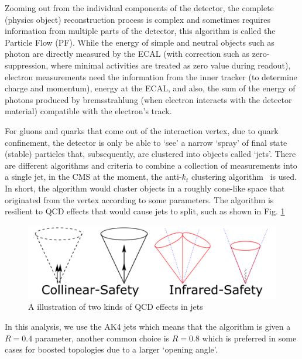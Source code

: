 Zooming out from the individual components of the detector, the complete (physics object) reconstruction
process is complex and sometimes requires information from multiple parts of the detector, this
algorithm is called the Particle Flow (PF)\cite{particle_flow}. While the energy of simple and neutral 
objects such as photon are directly measured by the ECAL (with correction such as zero-suppression, where minimal
activities are treated as zero value during readout), electron measurements
need the information from the inner tracker (to determine charge and momentum), energy at the ECAL, and
also, the sum of the energy of photons produced by bremsstrahlung (when electron interacts with the 
detector material) compatible with the electron's track.

For gluons and quarks that come out of the interaction vertex, due to quark confinement, the detector 
is only be able to `see' a narrow `spray' of final state (stable) particles that, subsequently, 
are clustered into objects called `jets'.
There are different algorithms and criteria to combine a collection of measurements into a single jet,
in the CMS at the moment, the anti-$k_t$ clustering algorithm~\cite{anti_k,fastjet} is used. In short, the algorithm would cluster objects
in a roughly cone-like space that originated from the vertex according to some parameters.
The algorithm is resilient to QCD effects that would cause jets to split, such as shown in Fig.
\ref{fig:jet_split}

\begin{figure}[htb]
\begin{center}
\includegraphics[width=.85\linewidth]{fig/jet_split.png}
\end{center}
\caption{A illustration of two kinds of QCD effects in jets\protect\footnotemark}
\label{fig:jet_split}
\end{figure}

In this analysis, we use the AK4 jets which means that the algorithm is given a $R=0.4$ parameter, another
common choice is $R=0.8$ which is preferred in some cases for boosted topologies due to a larger `opening
angle'.

